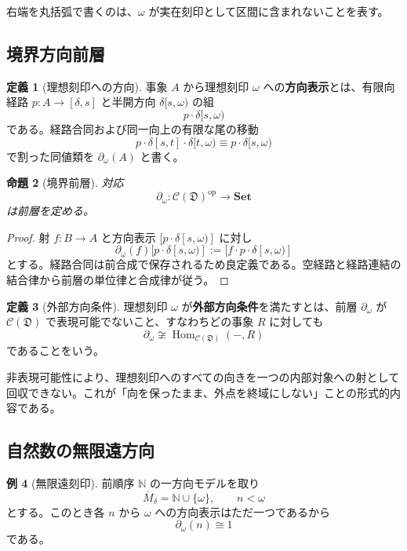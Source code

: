 \documentclass[a4paper,11pt]{ltjsarticle}
\theoremstyle{definition}
\newtheorem{definition}{定義}[section]
\newtheorem{example}[definition]{例}
\theoremstyle{plain}
\newtheorem{proposition}[definition]{命題}
\newcommand{\Set}{\mathbf{Set}}
\newcommand{\Hom}{\operatorname{Hom}}
\begin{document}
右端を丸括弧で書くのは、$\omega$ が実在刻印として区間に含まれないことを表す。

\subsection{境界方向前層}

\begin{definition}[理想刻印への方向]
事象 $A$ から理想刻印 $\omega$ への\textbf{方向表示}とは、有限向経路 $p:A\to[\delta,s]$ と半開方向 $\delta[s,\omega)$ の組
\[
 p\cdot\delta[s,\omega)
\]
である。経路合同および同一向上の有限な尾の移動
\[
 p\cdot\delta[s,t]\cdot\delta[t,\omega)
 \equiv
 p\cdot\delta[s,\omega)
\]
で割った同値類を $\partial_\omega(A)$ と書く。
\end{definition}

\begin{proposition}[境界前層]
対応
\[
 \partial_\omega:
 \mathcal C(\mathfrak D)^{\mathrm{op}}\longrightarrow\Set
\]
は前層を定める。
\end{proposition}

\begin{proof}
射 $f:B\to A$ と方向表示 $[p\cdot\delta[s,\omega)]$ に対し
\[
 \partial_\omega(f)
 [p\cdot\delta[s,\omega)]
 :=
 [f\cdot p\cdot\delta[s,\omega)]
\]
とする。経路合同は前合成で保存されるため良定義である。空経路と経路連結の結合律から前層の単位律と合成律が従う。
\end{proof}

\begin{definition}[外部方向条件]
理想刻印 $\omega$ が\textbf{外部方向条件}を満たすとは、前層 $\partial_\omega$ が $\mathcal C(\mathfrak D)$ で表現可能でないこと、すなわちどの事象 $R$ に対しても
\[
 \partial_\omega
 \not\cong
 \Hom_{\mathcal C(\mathfrak D)}(-,R)
\]
であることをいう。
\end{definition}

非表現可能性により、理想刻印へのすべての向きを一つの内部対象への射として回収できない。これが「向を保ったまま、外点を終域にしない」ことの形式的内容である。

\subsection{自然数の無限遠方向}

\begin{example}[無限遠刻印]
前順序 $\mathbb N$ の一方向モデルを取り
\[
 \overline M_\delta
 =\mathbb N\cup\{\omega\},
 \qquad
 n<\omega
\]
とする。このとき各 $n$ から $\omega$ への方向表示はただ一つであるから
\[
 \partial_\omega(n)\cong 1
\]
である。
\end{example}
\end{document}
